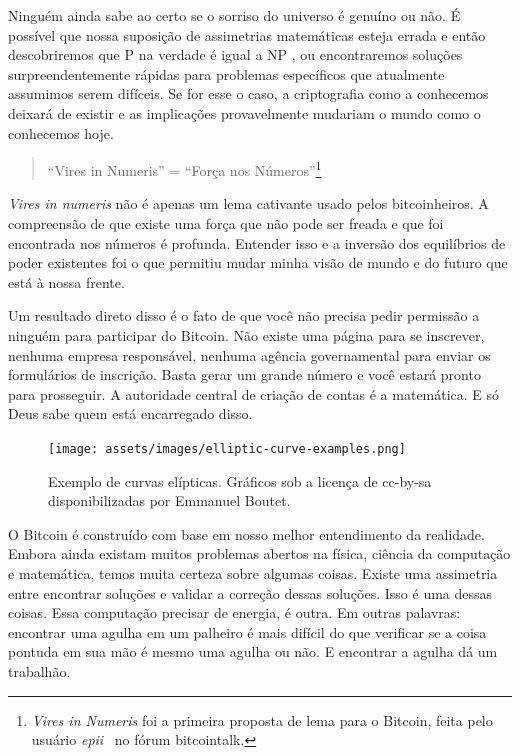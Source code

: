 Ninguém ainda sabe ao certo se o sorriso do universo é genuíno ou não. É possível que nossa suposição de assimetrias matemáticas esteja errada e então descobriremos que P na verdade é igual a NP \cite{wiki:pnp}, ou encontraremos soluções surpreendentemente rápidas para problemas específicos \cite{wiki:discrete-log} que atualmente assumimos serem difíceis. Se for esse o caso, a criptografia como a conhecemos deixará de existir e as implicações provavelmente mudariam o mundo como o conhecemos hoje.

\begin{quotation}\begin{samepage}
\enquote{Vires in Numeris} = \enquote{Força nos Números}\footnote{\textit{Vires in Numeris} foi a primeira proposta de lema para o Bitcoin, feita pelo usuário \textit{epii}~\cite{epii} no fórum bitcointalk.}
\end{samepage}\end{quotation}

\textit{Vires in numeris} não é apenas um lema cativante usado pelos bitcoinheiros. A compreensão de que existe uma força que não pode ser freada e que foi encontrada nos números é profunda. Entender isso e a inversão dos equilíbrios de poder existentes foi o que permitiu mudar minha visão de mundo e do futuro que está à nossa frente.

Um resultado direto disso é o fato de que você não precisa pedir permissão a ninguém para participar do Bitcoin. Não existe uma página para se inscrever, nenhuma empresa responsável, nenhuma agência governamental para enviar os formulários de inscrição. Basta gerar um grande número e você estará pronto para prosseguir. A autoridade central de criação de contas é a matemática. E só Deus sabe quem está encarregado disso.

\begin{figure}
  \texttt{[image: assets/images/elliptic-curve-examples.png]}
  \caption{Exemplo de curvas elípticas. Gráficos sob a licença de cc-by-sa disponibilizadas por Emmanuel Boutet.}
  \label{fig:elliptic-curve-examples}
\end{figure}

O Bitcoin é construído com base em nosso melhor entendimento da realidade. Embora ainda existam muitos problemas abertos na física, ciência da computação e matemática, temos muita certeza sobre algumas coisas. Existe uma assimetria entre encontrar soluções e validar a correção dessas soluções. Isso é uma dessas coisas. Essa computação precisar de energia, é outra. Em outras palavras: encontrar uma agulha em um palheiro é mais difícil do que verificar se a coisa pontuda em sua mão é mesmo uma agulha ou não. E encontrar a agulha dá um trabalhão.

